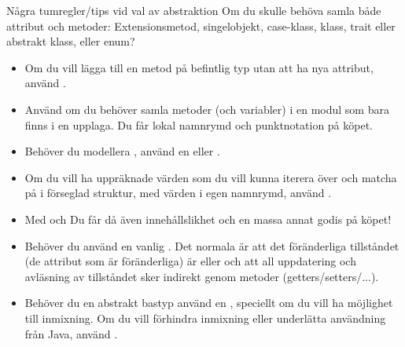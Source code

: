 \begin{Slide}{Några tumregler/tips vid val av abstraktion}\SlideFontSmall
Om du skulle behöva samla både attribut och metoder:
Extensionsmetod, singelobjekt, case-klass, klass, trait eller abstrakt klass, eller enum?
\begin{itemize}\SlideFontTiny
\item Om du vill lägga till en metod på befintlig typ utan att ha nya attribut, använd .
\item Använd  om du behöver samla metoder (och variabler) i en modul som bara finns i en upplaga. Du får lokal namnrymd och punktnotation på köpet.
\item Behöver du modellera , använd en  eller .  
\item Om du vill ha uppräknade värden som du vill kunna iterera över och matcha på i förseglad struktur, med värden i egen namnrymd, använd .
\item Med  och  Du får då även innehållslikhet och en massa annat godis på köpet!
\item Behöver du   använd en vanlig . Det normala är att det föränderliga tillståndet (de attribut som är föränderliga) är  eller  och att all uppdatering och avläsning av tillståndet sker indirekt genom metoder (getters/setters/...).
\item Behöver du en abstrakt bastyp använd en , speciellt om du vill ha möjlighet till inmixning.  Om du vill förhindra inmixning eller underlätta användning från Java, använd . 
\end{itemize}
\end{Slide}




